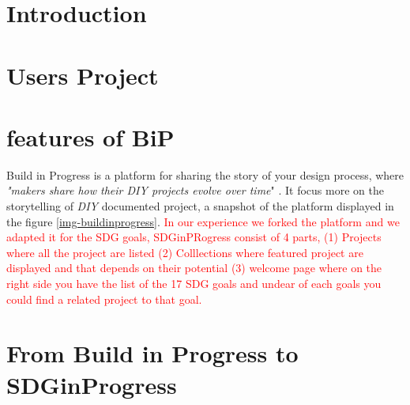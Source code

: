 \section{Introduction}

\section{Users Project}

\section{features of BiP}

Build in Progress is a platform for sharing the story of your design process, where \textit{"makers share how their DIY projects evolve over time}" \cite{tseng2016making}. It focus more on the storytelling of \textit{DIY} documented project, a snapshot of the platform displayed in the figure \ref{img-buildinprogress}. \textcolor{red}{In our experience we forked the platform and we adapted it for the SDG goals, SDGinPRogress consist of 4 parts, (1) Projects where all the project are listed (2) Colllections where featured project are displayed and that depends on their potential (3) welcome page where on the right side you have the list of the 17 SDG goals and undear of each goals you could find a related project to that goal.}

\section{From Build in Progress to SDGinProgress}

